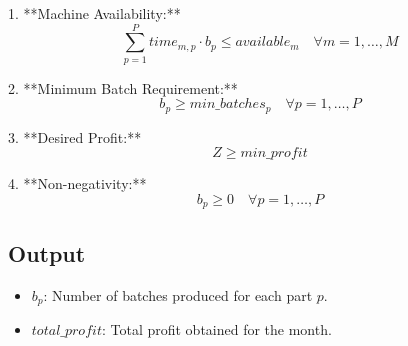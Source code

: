 \documentclass{article}
\begin{document}
1. **Machine Availability:**
\[
\sum_{p=1}^{P} time_{m,p} \cdot b_p \leq available_m \quad \forall m = 1, \ldots, M
\]

2. **Minimum Batch Requirement:**
\[
b_p \geq min\_batches_p \quad \forall p = 1, \ldots, P
\]

3. **Desired Profit:**
\[
Z \geq min\_profit
\]

4. **Non-negativity:**
\[
b_p \geq 0 \quad \forall p = 1, \ldots, P
\]

\subsection*{Output}
\begin{itemize}
    \item \( b_p \): Number of batches produced for each part \( p \).
    \item \( total\_profit \): Total profit obtained for the month.
\end{itemize}
\end{document}
